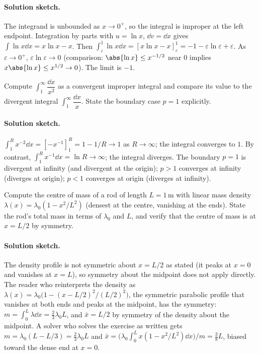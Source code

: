 \paragraph{Solution sketch.}
The integrand is unbounded as $x \to 0^{+}$, so the integral is
improper at the left endpoint. Integration by parts with $u = \ln
x$, $\dd v = \dd x$ gives $\int \ln x \dd x = x \ln x - x$. Then
$\int_{\varepsilon}^{1}\ln x \dd x = [x \ln x - x]_{\varepsilon}
^{1} = -1 - \varepsilon \ln \varepsilon + \varepsilon$. As
$\varepsilon \to 0^{+}$, $\varepsilon \ln \varepsilon \to 0$
(comparison: $\abs{\ln x} \leq x^{-1/2}$ near $0$ implies
$x \abs{\ln x} \leq x^{1/2} \to 0$). The limit is $-1$.

\begin{exercise}
Compute $\int_{1}^{\infty} \dfrac{\dd x}{x^{2}}$ as a convergent
improper integral and compare its value to the divergent integral
$\int_{1}^{\infty} \dfrac{\dd x}{x}$. State the boundary case
$p = 1$ explicitly.
\end{exercise}

\paragraph{Solution sketch.}
$\int_{1}^{R} x^{-2} \dd x = [-x^{-1}]_{1}^{R} = 1 - 1/R \to 1$ as
$R \to \infty$; the integral converges to $1$. By contrast,
$\int_{1}^{R} x^{-1} \dd x = \ln R \to \infty$; the integral
diverges. The boundary $p = 1$ is divergent at infinity (and
divergent at the origin); $p > 1$ converges at infinity (diverges
at origin); $p < 1$ converges at origin (diverges at infinity).

\begin{exercise}
Compute the centre of mass of a rod of length $L = 1\,\si{\meter}$
with linear mass density $\lambda(x) = \lambda_{0}(1 - x^{2}/L^{2})$
(densest at the centre, vanishing at the ends). State the rod's
total mass in terms of $\lambda_{0}$ and $L$, and verify that the
centre of mass is at $x = L/2$ by symmetry.
\end{exercise}

\paragraph{Solution sketch.}
The density profile is not symmetric about $x = L/2$ as stated
(it peaks at $x = 0$ and vanishes at $x = L$), so symmetry about
the midpoint does not apply directly. The reader who reinterprets
the density as $\lambda(x) = \lambda_{0}\bigl(1 - (x - L/2)^{2} /
(L/2)^{2}\bigr)$, the symmetric parabolic profile that vanishes
at both ends and peaks at the midpoint, has the symmetry: $m =
\int_{0}^{L}\lambda \dd x = \tfrac{2}{3}\lambda_{0} L$, and
$\bar{x} = L/2$ by symmetry of the density about the midpoint. A
solver who solves the exercise as written gets $m =
\lambda_{0}(L - L/3) = \tfrac{2}{3}\lambda_{0} L$ and $\bar{x} =
\bigl(\lambda_{0}\int_{0}^{L} x(1 - x^{2}/L^{2}) \dd x\bigr)/m =
\tfrac{3}{8}L$, biased toward the dense end at $x = 0$.

